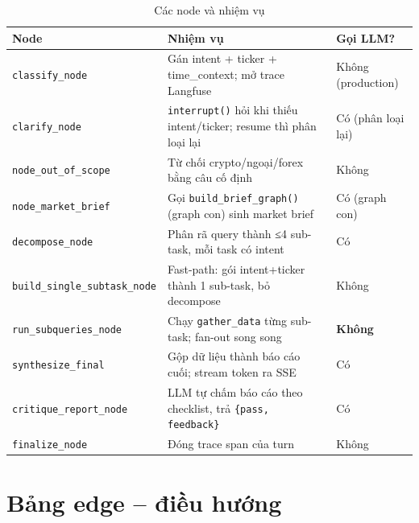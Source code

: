 \documentclass[12pt, a4paper]{report}
\begin{document}
\begin{table}[H]
\centering
\caption{Các node và nhiệm vụ}
\small
\begin{tabularx}{\textwidth}{lXl}
\toprule
\textbf{Node} & \textbf{Nhiệm vụ} & \textbf{Gọi LLM?} \\
\midrule
\texttt{classify\_node} & Gán intent + ticker + time\_context; mở trace Langfuse & Không (production) \\
\rowcolor{rowgray}
\texttt{clarify\_node} & \texttt{interrupt()} hỏi khi thiếu intent/ticker; resume thì phân loại lại & Có (phân loại lại) \\
\texttt{node\_out\_of\_scope} & Từ chối crypto/ngoại/forex bằng câu cố định & Không \\
\rowcolor{rowgray}
\texttt{node\_market\_brief} & Gọi \texttt{build\_brief\_graph()} (graph con) sinh market brief & Có (graph con) \\
\texttt{decompose\_node} & Phân rã query thành ≤4 sub-task, mỗi task có intent & Có \\
\rowcolor{rowgray}
\texttt{build\_single\_subtask\_node} & Fast-path: gói intent+ticker thành 1 sub-task, bỏ decompose & Không \\
\texttt{run\_subqueries\_node} & Chạy \texttt{gather\_data} từng sub-task; fan-out song song & \textbf{Không} \\
\rowcolor{rowgray}
\texttt{synthesize\_final} & Gộp dữ liệu thành báo cáo cuối; stream token ra SSE & Có \\
\texttt{critique\_report\_node} & LLM tự chấm báo cáo theo checklist, trả \texttt{\{pass, feedback\}} & Có \\
\rowcolor{rowgray}
\texttt{finalize\_node} & Đóng trace span của turn & Không \\
\bottomrule
\end{tabularx}
\end{table}

\section{Bảng edge -- điều hướng}
\end{document}
